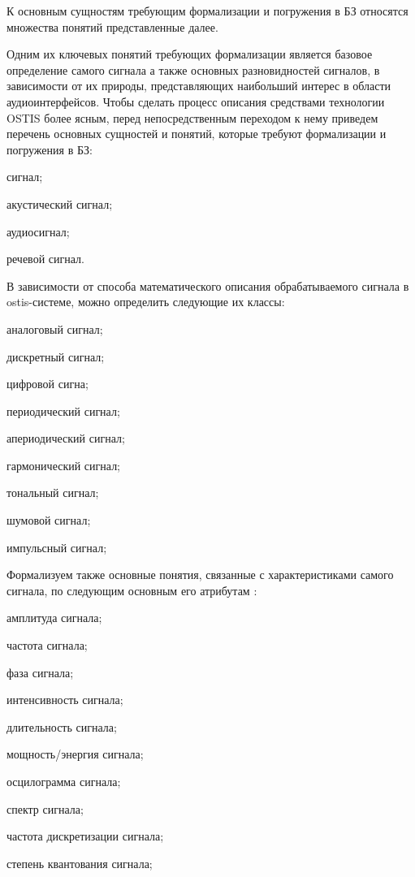 К основным сущностям требующим формализации и погружения в БЗ относятся множества понятий представленные далее. 

Одним их ключевых понятий требующих формализации является базовое определение самого сигнала а также основных разновидностей сигналов, в зависимости от их природы, представляющих наибольший интерес в области аудиоинтерфейсов. Чтобы сделать процесс описания средствами технологии OSTIS более ясным, перед непосредственным переходом к нему приведем перечень основных сущностей и понятий, которые требуют формализации и погружения в БЗ:

\begin{textitemize}    
    \item сигнал;
    \item акустический сигнал;
    \item аудиосигнал;
    \item речевой сигнал.
\end{textitemize}

В зависимости от способа математического описания обрабатываемого сигнала в ostis-системе, можно определить следующие их классы:

\begin{textitemize}    
    \item аналоговый сигнал;
    \item дискретный сигнал;
    \item цифровой сигна;
    \item периодический сигнал;
    \item апериодический сигнал;
    \item гармонический сигнал;
    \item тональный сигнал;
    \item шумовой сигнал;
    \item импульсный сигнал;
\end{textitemize}

Формализуем также основные понятия, связанные с характеристиками самого сигнала, по следующим основным его атрибутам \textit{}:
\begin{textitemize}  
    \item амплитуда сигнала;
    \item частота сигнала;
    \item фаза сигнала;
    \item интенсивность сигнала;
    \item длительность сигнала;
    \item мощность/энергия сигнала;
    \item осцилограмма сигнала;
    \item спектр сигнала;
    \item частота дискретизации сигнала;
    \item степень квантования сигнала;
\end{textitemize}

